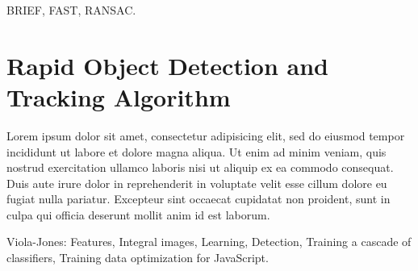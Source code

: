 BRIEF, FAST, RANSAC.


\section{Rapid Object Detection and Tracking Algorithm} %
\label{sec:computer_vision_library_for_the_web:rapid_object_detection_tracking_algorithm}

Lorem ipsum dolor sit amet, consectetur adipisicing elit, sed do eiusmod
tempor incididunt ut labore et dolore magna aliqua. Ut enim ad minim veniam,
quis nostrud exercitation ullamco laboris nisi ut aliquip ex ea commodo
consequat. Duis aute irure dolor in reprehenderit in voluptate velit esse
cillum dolore eu fugiat nulla pariatur. Excepteur sint occaecat cupidatat non
proident, sunt in culpa qui officia deserunt mollit anim id est laborum.

Viola-Jones: Features, Integral images, Learning, Detection, Training a cascade of classifiers, Training data optimization for JavaScript.


